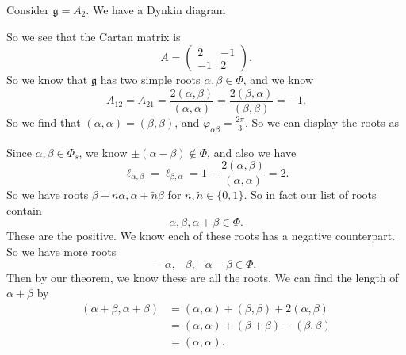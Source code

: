 \documentclass[a4paper]{article}
\begin{document}
\begin{eg}
  Consider $\mathfrak{g} = A_2$. We have a Dynkin diagram
  \begin{center}
  \end{center}
  So we see that the Cartan matrix is
  \[
    A =
    \begin{pmatrix}
      2 & -1\\
      -1 & 2
    \end{pmatrix}.
  \]
  So we know that $\mathfrak{g}$ has two simple roots $\alpha, \beta \in \Phi$, and we know
  \[
    A_{12} = A_{21} = \frac{2(\alpha, \beta)}{(\alpha, \alpha)} = \frac{2(\beta, \alpha)}{(\beta, \beta)} = -1.
  \]
  So we find that $(\alpha, \alpha) = (\beta, \beta)$, and $\varphi_{\alpha\beta} = \frac{2\pi}{3}$. So we can display the roots as
  \begin{center}
  \end{center}
  Since $\alpha, \beta \in \Phi_s$, we know $\pm(\alpha - \beta) \not\in \Phi$, and also we have
  \[
    \ell_{\alpha, \beta} = \ell_{\beta, \alpha} = 1 - \frac{2 (\alpha, \beta)}{(\alpha, \alpha)} = 2.
  \]
  So we have roots $\beta + n \alpha, \alpha + \tilde{n}\beta$ for $n, \tilde{n} \in \{0, 1\}$. So in fact our list of roots contain
  \[
    \alpha, \beta, \alpha + \beta \in \Phi.
  \]
  These are the positive. We know each of these roots has a negative counterpart. So we have more roots
  \[
    -\alpha, -\beta, -\alpha - \beta \in \Phi.
  \]
  Then by our theorem, we know these are all the roots. We can find the length of $\alpha + \beta$ by
  \begin{align*}
    (\alpha + \beta, \alpha + \beta) &= (\alpha, \alpha) + (\beta, \beta) + 2(\alpha, \beta)\\
    &= (\alpha, \alpha) + (\beta + \beta) - (\beta, \beta)\\
    &= (\alpha, \alpha).
  \end{align*}

\end{eg}
\end{document}
